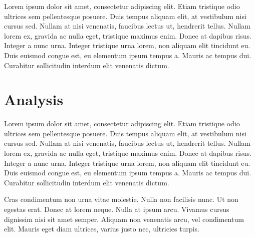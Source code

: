 \documentclass[11pt, a4paper]{resources/JTH}
\begin{document}
    Lorem ipsum dolor sit amet, consectetur adipiscing elit. Etiam tristique odio ultrices sem pellentesque posuere. Duis tempus aliquam elit, at vestibulum nisi cursus sed. Nullam at nisi venenatis, faucibus lectus ut, hendrerit tellus. Nullam lorem ex, gravida ac nulla eget, tristique maximus enim. Donec at dapibus risus. Integer a nunc urna. Integer tristique urna lorem, non aliquam elit tincidunt eu. Duis euismod congue est, eu elementum ipsum tempus a. Mauris ac tempus dui. Curabitur sollicitudin interdum elit venenatis dictum.

\section{Analysis}
\label{chap:Analysis}

    Lorem ipsum dolor sit amet, consectetur adipiscing elit. Etiam tristique odio ultrices sem pellentesque posuere. Duis tempus aliquam elit, at vestibulum nisi cursus sed. Nullam at nisi venenatis, faucibus lectus ut, hendrerit tellus. Nullam lorem ex, gravida ac nulla eget, tristique maximus enim. Donec at dapibus risus. Integer a nunc urna. Integer tristique urna lorem, non aliquam elit tincidunt eu. Duis euismod congue est, eu elementum ipsum tempus a. Mauris ac tempus dui. Curabitur sollicitudin interdum elit venenatis dictum.
    
    Cras condimentum non urna vitae molestie. Nulla non facilisis nunc. Ut non egestas erat. Donec at lorem neque. Nulla at ipsum arcu. Vivamus cursus dignissim nisi sit amet semper. Aliquam non venenatis arcu, vel condimentum elit. Mauris eget diam ultrices, varius justo nec, ultricies turpis.

\newpage


\end{document}
